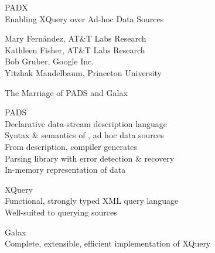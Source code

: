 \documentclass[landscape]{slides}
\begin{document}

\begin{slide}
\begin{center}\Large\color{blue}
PADX\\Enabling XQuery over Ad-hoc Data Sources

\large\color{black}
\begin{center}
Mary Fern\'andez, AT\&T Labs Research\\
Kathleen Fisher, AT\&T Labs Research\\
Bob Gruber, Google Inc.\\
Yitzhak Mandelbaum, Princeton University
\end{center}
\end{center}
\end{slide}

\begin{Slide}{The Marriage of PADS and Galax}
  
  \vspace*{1cm}
  \bb PADS\\
  \bbb Declarative data-stream description language\\
  \bbb Syntax \& semantics of \emph{}, ad hoc data sources \\
  \bbb From description, compiler generates\\
  \bbbb Parsing library with error detection \& recovery\\
  \bbbb In-memory representation of data

  \bb XQuery\\
  \bbb Functional, strongly typed XML query language \\
  \bbb Well-suited to querying \emph{} sources

  \bb Galax\\
  \bbb Complete, extensible, efficient implementation of XQuery

\end{Slide}
\end{document}
